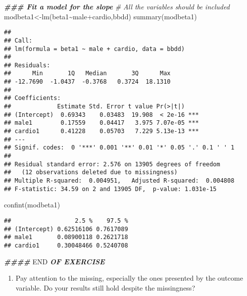 \documentclass[
]{article}
\newenvironment{Shaded}{\begin{snugshade}}{\end{snugshade}}
\newcommand{\CommentTok}[1]{\textcolor[rgb]{0.56,0.35,0.01}{\textit{#1}}}
\newcommand{\DocumentationTok}[1]{\textcolor[rgb]{0.56,0.35,0.01}{\textbf{\textit{#1}}}}
\newcommand{\FunctionTok}[1]{\textcolor[rgb]{0.00,0.00,0.00}{#1}}
\newcommand{\NormalTok}[1]{#1}
\newcommand{\OtherTok}[1]{\textcolor[rgb]{0.56,0.35,0.01}{#1}}
\newcommand{\RegionMarkerTok}[1]{#1}
\newcommand{\SpecialCharTok}[1]{\textcolor[rgb]{0.00,0.00,0.00}{#1}}
\providecommand{\tightlist}{%
  \setlength{\itemsep}{0pt}\setlength{\parskip}{0pt}}
\begin{document}
\begin{Shaded}
\begin{Highlighting}[]
\DocumentationTok{\#\#\# Fit a model for the slope}
\CommentTok{\# All the variables should be included}
\NormalTok{modbeta1}\OtherTok{\textless{}{-}}\FunctionTok{lm}\NormalTok{(beta1}\SpecialCharTok{\textasciitilde{}}\NormalTok{male}\SpecialCharTok{+}\NormalTok{cardio,bbdd)}
\FunctionTok{summary}\NormalTok{(modbeta1)}
\end{Highlighting}
\end{Shaded}

\begin{verbatim}
## 
## Call:
## lm(formula = beta1 ~ male + cardio, data = bbdd)
## 
## Residuals:
##      Min       1Q   Median       3Q      Max 
## -12.7690  -1.0437  -0.3768   0.3724  18.1310 
## 
## Coefficients:
##             Estimate Std. Error t value Pr(>|t|)    
## (Intercept)  0.69343    0.03483  19.908  < 2e-16 ***
## male1        0.17559    0.04417   3.975 7.07e-05 ***
## cardio1      0.41228    0.05703   7.229 5.13e-13 ***
## ---
## Signif. codes:  0 '***' 0.001 '**' 0.01 '*' 0.05 '.' 0.1 ' ' 1
## 
## Residual standard error: 2.576 on 13905 degrees of freedom
##   (12 observations deleted due to missingness)
## Multiple R-squared:  0.004951,   Adjusted R-squared:  0.004808 
## F-statistic: 34.59 on 2 and 13905 DF,  p-value: 1.031e-15
\end{verbatim}

\begin{Shaded}
\begin{Highlighting}[]
\FunctionTok{confint}\NormalTok{(modbeta1)}
\end{Highlighting}
\end{Shaded}

\begin{verbatim}
##                  2.5 %    97.5 %
## (Intercept) 0.62516106 0.7617089
## male1       0.08900118 0.2621718
## cardio1     0.30048466 0.5240708
\end{verbatim}

\begin{Shaded}
\begin{Highlighting}[]
\DocumentationTok{\#\#\#\# }\RegionMarkerTok{END}\DocumentationTok{ OF  EXERCISE}
\end{Highlighting}
\end{Shaded}

\begin{enumerate}
\def\labelenumi{\arabic{enumi}.}
\setcounter{enumi}{5}
\tightlist
\item
  Pay attention to the missing, especially the ones presented by the
  outcome variable. Do your results still hold despite the missingness?
\end{enumerate}
\end{document}
